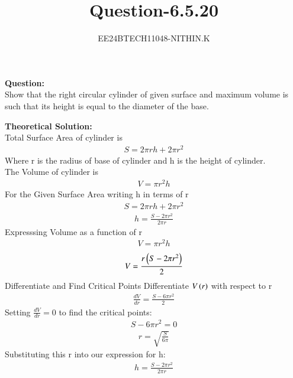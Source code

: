 \documentclass[journal]{IEEEtran}
\numberwithin{equation}{enumi}
\numberwithin{figure}{enumi}
\begin{document}


\title{Question-6.5.20}
\author{EE24BTECH11048-NITHIN.K} 
{\let\newpage\relax\maketitle}
\textbf{Question:} \\
Show that the right circular cylinder of given surface and maximum volume is such that its height is equal to the diameter of the base.

\textbf{Theoretical Solution:} \\
Total Surface Area of cylinder is
\begin{align}
	S = 2\pi rh + 2\pi r^2
\end{align}
Where r is the radius of base of cylinder and h is the height of cylinder. \\
The Volume of cylinder is
\begin{align}
	V = \pi r^2h
\end{align}
For the Given Surface Area writing h in terms of r
\begin{align}
	S = 2\pi rh + 2\pi r^2
\end{align}
\begin{align}
	h = \frac{S - 2\pi r^2}{2\pi r}
\end{align}
Expresssing Volume as a function of r
\begin{align}
	V = \pi r^2h
\end{align}
\begin{align}
	V = \frac{r\left(S - 2\pi r^2\right)}{2}
\end{align}
Differentiate and Find Critical Points
Differentiate $V\left(r\right)$ with respect to r
\begin{align}
	\frac{dV}{dr} = \frac{S - 6\pi r^2}{2}
\end{align}
Setting $\frac{dV}{dr} = 0$ to find the critical points:
\begin{align}
	S - 6\pi r^2 = 0
\end{align}
\begin{align}
	r = \sqrt{\frac{S}{6\pi}}
\end{align}
Substituting this r into our expression for h:
\begin{align}
	h = \frac{S - 2\pi r^2}{2\pi r}
\end{align}
\end{document}
